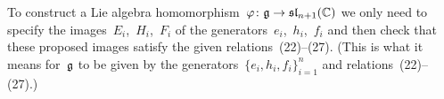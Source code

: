 \section{}





\subsection{}

To construct a Lie algebra homomorphism~$\varphi \colon \mathfrak{g} \to \mathfrak{sl}_{n+1}(\mathbb{C})$ we only need to specify the images~$E_i$,~$H_i$,~$F_i$ of the generators~$e_i$,~$h_i$,~$f_i$ and then check that these proposed images satisfy the given relations~(22)--(27).
(This is what it means for~$\mathfrak{g}$ to be given by the generators~$\{ e_i, h_i, f_i \}_{i=1}^n$ and relations~(22)--(27).)

